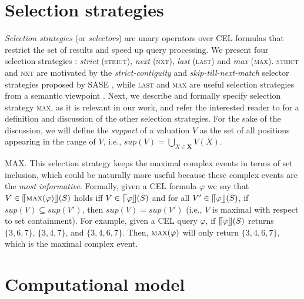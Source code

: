 \section{Selection strategies}\label{sec:selection_strategies}

\emph{Selection strategies} (or \emph{selectors}) are unary operators over CEL formulas that restrict the set of results and speed up query processing. We present four selection strategies \cite{formal-framework-cep,formal-framework-cer}: \emph{strict} (\textsc{strict}), \emph{next} (\textsc{nxt}), \emph{last} (\textsc{last}) and \emph{max} (\textsc{max}). \textsc{strict} and \textsc{nxt} are motivated by the \emph{strict-contiguity} and \emph{skip-till-next-match} selector strategies proposed by SASE \cite{sase}, while \textsc{last} and \textsc{max} are useful selection strategies from a semantic viewpoint \cite{formal-framework-cer}. Next, we describe and formally specify selection strategy \textsc{max}, as it is relevant in our work, and refer the interested reader to \cite{formal-framework-cer} for a definition and discussion of the other selection strategies. For the sake of the discussion, we will define the \emph{support} of a valuation $V$ as the set of all positions appearing in the range of $V$, i.e., $sup(V) = \bigcup\limits_{X \in \textbf{X}}V(X)$.

\textsc{MAX}. This selection strategy keeps the maximal complex events in terms of set inclusion, which could be naturally more useful because these complex events are the \emph{most informative}. Formally, given a CEL formula $\varphi$ we say that $V \in \llceil \textsc{max}(\varphi) \rrfloor(S)$ holds iff $V \in \llceil \varphi \rrfloor(S)$ and for all $V' \in \llceil \varphi \rrfloor(S)$, if $sup(V) \subseteq sup(V')$, then $sup(V) = sup(V')$ (i.e., $V$ is maximal with respect to set containment). For example, given a CEL query $\varphi$, if $\llceil \varphi \rrfloor(S)$ returns $\{ 3,6,7\}$, $\{3,4,7\}$, and $\{3,4,6,7\}$. Then, $\textsc{max}(\varphi)$ will only return $\{ 3, 4, 6, 7\}$, which is the maximal complex event.

\section{Computational model}\label{sec:cea}

